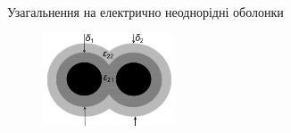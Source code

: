 \documentclass[10pt]{beamer}
\begin{document}
\begin{frame}{Узагальнення на електрично неоднорідні оболонки}
\footnotesize

\begin{figure}
\vspace{-20pt}
  \begin{center}
    \includegraphics[width=0.35\textwidth]{images/2shell.png}
  \end{center}
\vspace{-25pt}
\end{figure}


\end{frame}
\end{document}
